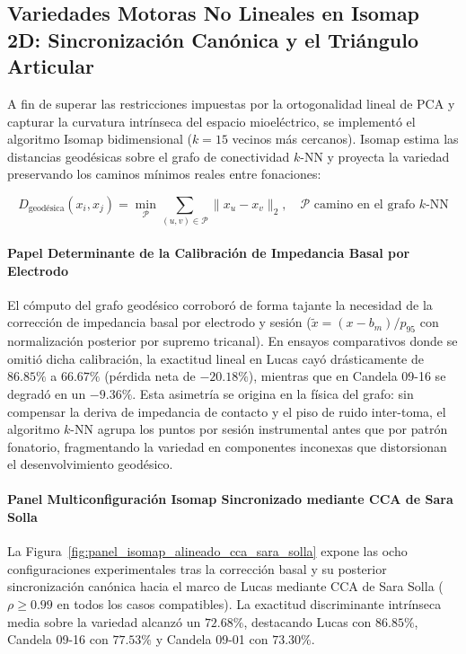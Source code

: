 \documentclass[11pt,a4paper]{article}
\begin{document}
\subsection{Variedades Motoras No Lineales en Isomap 2D: Sincronización Canónica y el Triángulo Articular}
\label{subsec:isomap_variedades_no_lineales}

A fin de superar las restricciones impuestas por la ortogonalidad lineal de PCA y capturar la curvatura intrínseca del espacio mioeléctrico, se implementó el algoritmo Isomap bidimensional ($k=15$ vecinos más cercanos). Isomap estima las distancias geodésicas sobre el grafo de conectividad $k$-NN y proyecta la variedad preservando los caminos mínimos reales entre fonaciones:

\begin{equation}
    D_{\text{geodésica}}(x_i, x_j) = \min_{\mathcal{P}} \sum_{(u, v) \in \mathcal{P}} \|x_u - x_v\|_2, \quad \mathcal{P} \text{ camino en el grafo } k\text{-NN}
\end{equation}

\paragraph{Papel Determinante de la Calibración de Impedancia Basal por Electrodo}
El cómputo del grafo geodésico corroboró de forma tajante la necesidad de la corrección de impedancia basal por electrodo y sesión ($\tilde{x} = (x - b_m) / p_{95}$ con normalización posterior por supremo tricanal). En ensayos comparativos donde se omitió dicha calibración, la exactitud lineal en Lucas cayó drásticamente de $86.85\%$ a $66.67\%$ (pérdida neta de $-20.18\%$), mientras que en Candela 09-16 se degradó en un $-9.36\%$. Esta asimetría se origina en la física del grafo: sin compensar la deriva de impedancia de contacto y el piso de ruido inter-toma, el algoritmo $k$-NN agrupa los puntos por sesión instrumental antes que por patrón fonatorio, fragmentando la variedad en componentes inconexas que distorsionan el desenvolvimiento geodésico.

\paragraph{Panel Multiconfiguración Isomap Sincronizado mediante CCA de Sara Solla}
La Figura~\ref{fig:panel_isomap_alineado_cca_sara_solla} expone las ocho configuraciones experimentales tras la corrección basal y su posterior sincronización canónica hacia el marco de Lucas mediante CCA de Sara Solla ($\rho \ge 0.99$ en todos los casos compatibles). La exactitud discriminante intrínseca media sobre la variedad alcanzó un $72.68\%$, destacando Lucas con $86.85\%$, Candela 09-16 con $77.53\%$ y Candela 09-01 con $73.30\%$.
\end{document}
